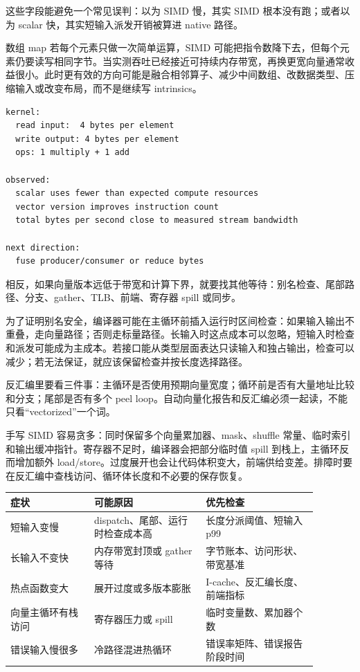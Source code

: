 这些字段能避免一个常见误判：以为 SIMD 慢，其实 SIMD 根本没有跑；或者以为 scalar 快，其实短输入派发开销被算进 native 路径。

数组 map 若每个元素只做一次简单运算，SIMD 可能把指令数降下去，但每个元素仍要读写相同字节。当实测吞吐已经接近可持续内存带宽，再换更宽向量通常收益很小。此时更有效的方向可能是融合相邻算子、减少中间数组、改数据类型、压缩输入或改变布局，而不是继续写 intrinsics。

\begin{lstlisting}[numbers=none,caption={带宽封顶的判断形状}]
kernel:
  read input:  4 bytes per element
  write output: 4 bytes per element
  ops: 1 multiply + 1 add

observed:
  scalar uses fewer than expected compute resources
  vector version improves instruction count
  total bytes per second close to measured stream bandwidth

next direction:
  fuse producer/consumer or reduce bytes
\end{lstlisting}

相反，如果向量版本远低于带宽和计算下界，就要找其他等待：别名检查、尾部路径、分支、gather、TLB、前端、寄存器 spill 或同步。

为了证明别名安全，编译器可能在主循环前插入运行时区间检查：如果输入输出不重叠，走向量路径；否则走标量路径。长输入时这点成本可以忽略，短输入时检查和派发可能成为主成本。若接口能从类型层面表达只读输入和独占输出，检查可以减少；若无法保证，就应该保留检查并按长度选择路径。

反汇编里要看三件事：主循环是否使用预期向量宽度；循环前是否有大量地址比较和分支；尾部是否有多个 peel loop。自动向量化报告和反汇编必须一起读，不能只看“vectorized”一个词。

手写 SIMD 容易贪多：同时保留多个向量累加器、mask、shuffle 常量、临时索引和输出缓冲指针。寄存器不足时，编译器会把部分临时值 spill 到栈上，主循环反而增加额外 load/store。过度展开也会让代码体积变大，前端供给变差。排障时要在反汇编中查栈访问、循环体长度和不必要的保存恢复。

\begin{center}
\begin{tabular}{p{0.24\linewidth}p{0.32\linewidth}p{0.32\linewidth}}
\toprule
症状 & 可能原因 & 优先检查 \\
\midrule
短输入变慢 & dispatch、尾部、运行时检查成本高 & 长度分派阈值、短输入 p99 \\
长输入不变快 & 内存带宽封顶或 gather 等待 & 字节账本、访问形状、带宽基准 \\
热点函数变大 & 展开过度或多版本膨胀 & I-cache、反汇编长度、前端指标 \\
向量主循环有栈访问 & 寄存器压力或 spill & 临时变量数、累加器个数 \\
错误输入慢很多 & 冷路径混进热循环 & 错误率矩阵、错误报告阶段时间 \\
\bottomrule
\end{tabular}
\end{center}

